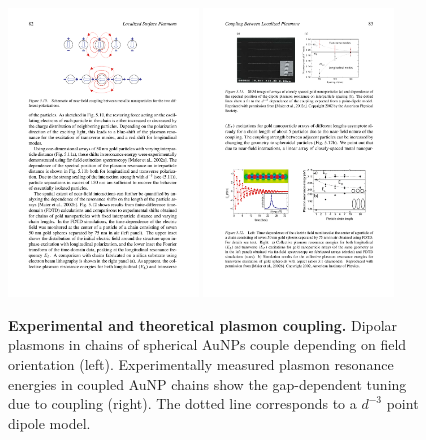 \documentclass{article}
\begin{document}
\begin{figure}[bt]
\centering
\includegraphics[width=0.45\textwidth]{figures/literature/maier_plasmonics_coupling_diagram}
\quad
\includegraphics[width=0.45\textwidth]{figures/literature/maier_plasmonics_coupling}
\caption[Experimental and theoretical plasmon coupling]{\textbf{Experimental and theoretical plasmon coupling.} Dipolar plasmons in chains of spherical AuNPs couple depending on field orientation \cite{maier2007plasmonics} (left). Experimentally measured plasmon resonance energies in coupled AuNP chains show the gap-dependent tuning due to coupling \cite{maier2002} (right). The dotted line corresponds to a $d^{-3}$ point dipole model.}
\label{fig:maier_plasmon_coupling}
\end{figure}
\end{document}
